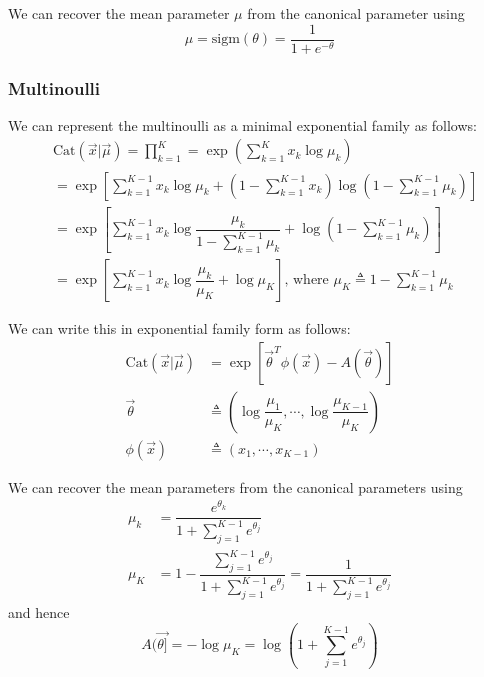 We can recover the mean parameter $\mu$ from the canonical parameter using
\begin{equation}
\mu=\mathrm{sigm}(\theta)=\dfrac{1}{1+e^{-\theta}}
\end{equation}


\subsubsection{Multinoulli}
We can represent the multinoulli as a minimal exponential family as follows:
\begin{equation*}\begin{split}
& \mathrm{Cat}(\vec{x}|\vec{\mu}) = \prod\limits_{k=1}^K = \exp\left(\sum\limits_{k=1}^K x_k\log\mu_k\right) \\
& = \exp\left[\sum\limits_{k=1}^{K-1} x_k\log\mu_k+  (1-\sum\limits_{k=1}^{K-1} x_k)\log(1-\sum\limits_{k=1}^{K-1} \mu_k)\right] \\
& = \exp\left[\sum\limits_{k=1}^{K-1} x_k\log\dfrac{\mu_k}{1-\sum_{k=1}^{K-1} \mu_k} + \log(1-\sum\limits_{k=1}^{K-1} \mu_k) \right] \\
& = \exp\left[\sum\limits_{k=1}^{K-1} x_k\log\dfrac{\mu_k}{\mu_K}+\log\mu_K\right] \text{, where } \mu_K \triangleq 1-\sum\limits_{k=1}^{K-1} \mu_k
\end{split}\end{equation*}

We can write this in exponential family form as follows:
\begin{align}
\mathrm{Cat}(\vec{x}|\vec{\mu}) & = \exp[\vec{\theta}^T\phi(\vec{x})-A(\vec{\theta})] \\
\vec{\theta} & \triangleq (\log\dfrac{\mu_1}{\mu_K},\cdots,\log\dfrac{\mu_{K-1}}{\mu_K}) \\
\phi(\vec{x}) & \triangleq (x_1,\cdots,x_{K-1})
\end{align}

We can recover the mean parameters from the canonical parameters using
\begin{align}
\mu_k & = \dfrac{e^{\theta_k}}{1+\sum_{j=1}^{K-1} e^{\theta_j}} \\
\mu_K & = 1- \dfrac{\sum_{j=1}^{K-1} e^{\theta_j}}{1+\sum_{j=1}^{K-1} e^{\theta_j}}=\dfrac{1}{1+\sum_{j=1}^{K-1} e^{\theta_j}}
\end{align}
and hence
\begin{equation}
A(\vec{\theta]} = -\log\mu_K=\log(1+\sum\limits_{j=1}^{K-1} e^{\theta_j})
\end{equation}


